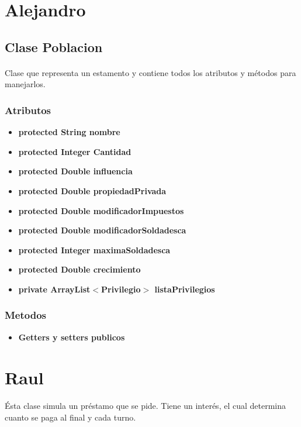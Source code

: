 \documentclass[12pt,a4paper]{article}
\begin{document}
\section{Alejandro}
    \subsection{Clase Poblacion}
    \paragraph{}
    Clase que representa un estamento y contiene todos los atributos y métodos para manejarlos.
            \subsubsection{Atributos}
            \begin{itemize}
                \item \textbf{protected String nombre}
                \item \textbf{protected Integer Cantidad}
                \item \textbf{protected Double influencia}
                \item \textbf{protected Double propiedadPrivada}
                \item \textbf{protected Double modificadorImpuestos}
                \item \textbf{protected Double modificadorSoldadesca}
                \item \textbf{protected Integer maximaSoldadesca}
                \item \textbf{protected Double crecimiento}
                \item \textbf{private ArrayList$<$Privilegio$>$ listaPrivilegios}
            \end{itemize}
            \subsubsection{Metodos}
            \begin{itemize}
                \item \textbf{Getters y setters publicos}
            \end{itemize}
\section{Raul}
    \paragraph{}
    Ésta clase simula un préstamo que se pide. Tiene un interés, el cual determina cuanto se paga al final y cada turno. 
\end{document}
